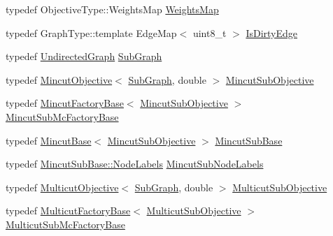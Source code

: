 \begin{DoxyCompactItemize}
\item 
typedef Objective\+Type\+::\+Weights\+Map \hyperlink{classnifty_1_1graph_1_1optimization_1_1multicut_1_1Cgc_a6d3ba8605fd7c111fca7a9f79ca09c32}{Weights\+Map}
\item 
typedef Graph\+Type\+::template Edge\+Map$<$ uint8\+\_\+t $>$ \hyperlink{classnifty_1_1graph_1_1optimization_1_1multicut_1_1Cgc_a9aab1ca56069c4f2801a35bf05620465}{Is\+Dirty\+Edge}
\item 
typedef \hyperlink{classnifty_1_1graph_1_1UndirectedGraph}{Undirected\+Graph} \hyperlink{classnifty_1_1graph_1_1optimization_1_1multicut_1_1Cgc_a477a719159f23300cd8e627a825e9275}{Sub\+Graph}
\item 
typedef \hyperlink{classnifty_1_1graph_1_1MincutObjective}{Mincut\+Objective}$<$ \hyperlink{classnifty_1_1graph_1_1optimization_1_1multicut_1_1Cgc_a477a719159f23300cd8e627a825e9275}{Sub\+Graph}, double $>$ \hyperlink{classnifty_1_1graph_1_1optimization_1_1multicut_1_1Cgc_a69d467869906adbb17d20768c6e9d6a5}{Mincut\+Sub\+Objective}
\item 
typedef \hyperlink{classnifty_1_1graph_1_1MincutFactoryBase}{Mincut\+Factory\+Base}$<$ \hyperlink{classnifty_1_1graph_1_1optimization_1_1multicut_1_1Cgc_a69d467869906adbb17d20768c6e9d6a5}{Mincut\+Sub\+Objective} $>$ \hyperlink{classnifty_1_1graph_1_1optimization_1_1multicut_1_1Cgc_a73eaf6193f5822782a586aa890d3f05a}{Mincut\+Sub\+Mc\+Factory\+Base}
\item 
typedef \hyperlink{classnifty_1_1graph_1_1MincutBase}{Mincut\+Base}$<$ \hyperlink{classnifty_1_1graph_1_1optimization_1_1multicut_1_1Cgc_a69d467869906adbb17d20768c6e9d6a5}{Mincut\+Sub\+Objective} $>$ \hyperlink{classnifty_1_1graph_1_1optimization_1_1multicut_1_1Cgc_acc73bcc6196a77bd128d62999de28181}{Mincut\+Sub\+Base}
\item 
typedef \hyperlink{classnifty_1_1graph_1_1MincutBase_a9dc6555e37d38de23f194f87ca1497d5}{Mincut\+Sub\+Base\+::\+Node\+Labels} \hyperlink{classnifty_1_1graph_1_1optimization_1_1multicut_1_1Cgc_a6d0c73820ef02657096a50dd6f115201}{Mincut\+Sub\+Node\+Labels}
\item 
typedef \hyperlink{classnifty_1_1graph_1_1MulticutObjective}{Multicut\+Objective}$<$ \hyperlink{classnifty_1_1graph_1_1optimization_1_1multicut_1_1Cgc_a477a719159f23300cd8e627a825e9275}{Sub\+Graph}, double $>$ \hyperlink{classnifty_1_1graph_1_1optimization_1_1multicut_1_1Cgc_a437e2332f586cdb3f4ee55e3cf1ea224}{Multicut\+Sub\+Objective}
\item 
typedef \hyperlink{classnifty_1_1graph_1_1MulticutFactoryBase}{Multicut\+Factory\+Base}$<$ \hyperlink{classnifty_1_1graph_1_1optimization_1_1multicut_1_1Cgc_a437e2332f586cdb3f4ee55e3cf1ea224}{Multicut\+Sub\+Objective} $>$ \hyperlink{classnifty_1_1graph_1_1optimization_1_1multicut_1_1Cgc_a6d51da2980311e5646e75fc433b4f8fb}{Multicut\+Sub\+Mc\+Factory\+Base}

\end{DoxyCompactItemize}
